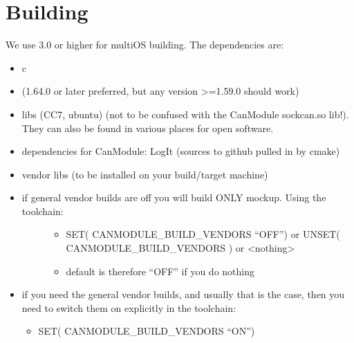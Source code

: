 \documentclass[a4paper,10pt,english]{sphinxmanual}
\begin{document}
\chapter{Building}
\label{\detokenize{building:building}}\label{\detokenize{building::doc}}
We use  3.0 or higher for multi\sphinxhyphen{}OS building.
The dependencies are:
\begin{itemize}
\item {} 
\sphinxhyphen{}c

\item {} 
 (1.64.0 or later preferred, but any version \textgreater{}=1.59.0 should work)

\item {} 
 libs (CC7, ubuntu) (not to be confused with the CanModule sockcan.so lib!).
They can also be found in various places for open software.

\item {} 
dependencies for CanModule: LogIt (sources to github pulled in by cmake)

\item {} 
vendor libs (to be installed on your build/target machine)

\item {} \begin{description}
\item[{if general vendor builds are off you will build ONLY mockup. Using the toolchain:}] \leavevmode\begin{itemize}
\item {} 
SET( CANMODULE\_BUILD\_VENDORS “OFF”) or UNSET( CANMODULE\_BUILD\_VENDORS ) or \textless{}nothing\textgreater{}

\item {} 
default is therefore “OFF” if you do nothing

\end{itemize}

\end{description}

\item {} 
if you need the general vendor builds, and usually that is the case, then you need to
switch them on explicitly in the toolchain:
\begin{itemize}
\item {} 
SET( CANMODULE\_BUILD\_VENDORS “ON”)


\end{itemize}
\end{itemize}
\end{document}
